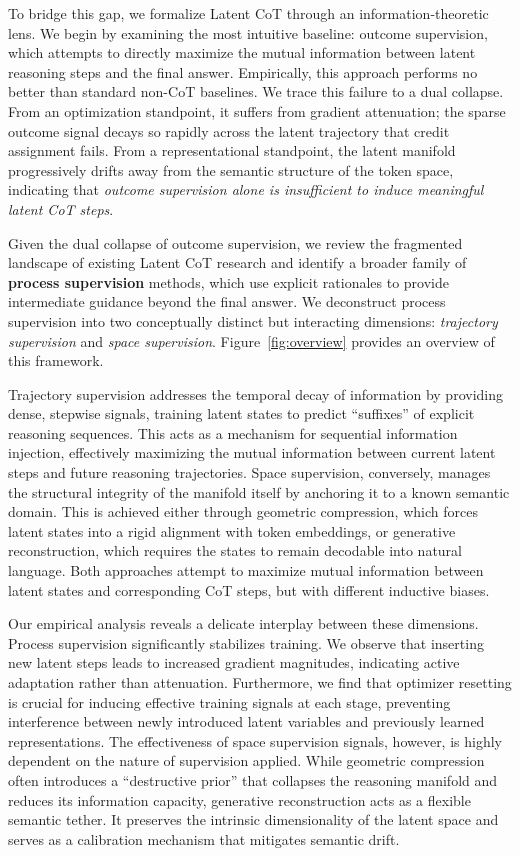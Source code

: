 To bridge this gap, we formalize Latent CoT through an information-theoretic lens. We begin by examining the most intuitive baseline: outcome supervision, which attempts to directly maximize the mutual information between latent reasoning steps and the final answer. Empirically, this approach performs no better than standard non-CoT baselines. We trace this failure to a dual collapse. From an optimization standpoint, it suffers from gradient attenuation; the sparse outcome signal decays so rapidly across the latent trajectory that credit assignment fails. From a representational standpoint, the latent manifold progressively drifts away from the semantic structure of the token space, indicating that \emph{outcome supervision alone is insufficient to induce meaningful latent CoT steps}.


Given the dual collapse of outcome supervision, we review the fragmented landscape of existing Latent CoT research and identify a broader family of \textbf{process supervision} methods, which use explicit rationales to provide intermediate guidance beyond the final answer. 
We deconstruct process supervision into two conceptually distinct but interacting dimensions: \textit{trajectory supervision} and \textit{space supervision}.
Figure~\ref{fig:overview} provides an overview of this framework.

Trajectory supervision addresses the temporal decay of information by providing dense, stepwise signals, training latent states to predict ``suffixes'' of explicit reasoning sequences. This acts as a mechanism for sequential information injection, effectively maximizing the mutual information between current latent steps and future reasoning trajectories. Space supervision, conversely, manages the structural integrity of the manifold itself by anchoring it to a known semantic domain. This is achieved either through geometric compression, which forces latent states into a rigid alignment with token embeddings, or generative reconstruction, which requires the states to remain decodable into natural language. Both approaches attempt to maximize mutual information between latent states and corresponding CoT steps, but with different inductive biases.

Our empirical analysis reveals a delicate interplay between these dimensions. Process supervision significantly stabilizes training. We observe that inserting new latent steps leads to increased gradient magnitudes, indicating active adaptation rather than attenuation. Furthermore, we find that optimizer resetting is crucial for inducing effective training signals at each stage, preventing interference between newly introduced latent variables and previously learned representations. The effectiveness of space supervision signals, however, is highly dependent on the nature of supervision applied. While geometric compression often introduces a ``destructive prior'' that collapses the reasoning manifold and reduces its information capacity, generative reconstruction acts as a flexible semantic tether. It preserves the intrinsic dimensionality of the latent space and serves as a calibration mechanism that mitigates semantic drift.

